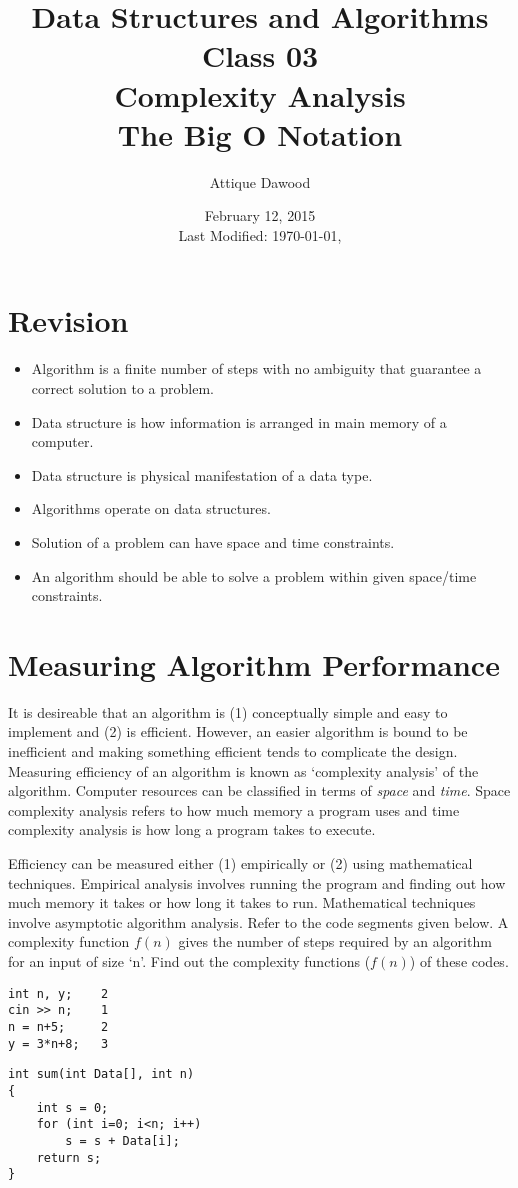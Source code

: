 \documentclass[12pt,a4paper]{article}
\title{Data Structures and Algorithms\\Class 03\\Complexity Analysis\\The Big O Notation}
\author{Attique Dawood}
\date{February 12, 2015\\[0.2cm] Last Modified: \today, \currenttime}
\begin{document}
\maketitle
\section{Revision}
\begin{itemize}
\item Algorithm is a finite number of steps with no ambiguity that guarantee a correct solution to a problem.
\item Data structure is how information is arranged in main memory of a computer.
\item Data structure is physical manifestation of a data type.
\item Algorithms operate on data structures.
\item Solution of a problem can have space and time constraints.
\item An algorithm should be able to solve a problem within given space/time constraints.
\end{itemize}
\section{Measuring Algorithm Performance}
It is desireable that an algorithm is (1) conceptually simple and easy to implement and (2) is efficient. However, an easier algorithm is bound to be inefficient and making something efficient tends to complicate the design. Measuring efficiency of an algorithm is known as `complexity analysis' of the algorithm. Computer resources can be classified in terms of \textit{space} and \textit{time}. Space complexity analysis refers to how much memory a program uses and time complexity analysis is how long a program takes to execute.

Efficiency can be measured either (1) empirically or (2) using mathematical techniques. Empirical analysis involves running the program and finding out how much memory it takes or how long it takes to run. Mathematical techniques involve asymptotic algorithm analysis. Refer to the code segments given below. A complexity function $f(n)$ gives the number of steps required by an algorithm for an input of size `n'. Find out the complexity functions ($f(n)$) of these codes.
\begin{lstlisting}
int n, y;    2
cin >> n;    1
n = n+5;     2
y = 3*n+8;   3
\end{lstlisting}
\begin{lstlisting}
int sum(int Data[], int n)
{
    int s = 0;
    for (int i=0; i<n; i++)
        s = s + Data[i];
    return s;
}
\end{lstlisting}
\end{document}

